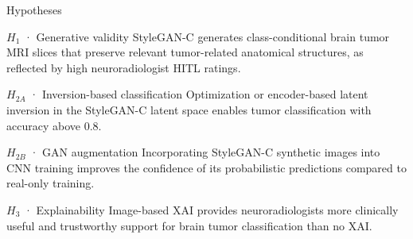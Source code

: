 \documentclass[aspectratio=169]{beamer}
\begin{document}
\begin{frame}{Hypotheses}
  \scriptsize
  {%
  \begin{exampleblock}{$H_1$ · Generative validity}
    StyleGAN-C generates class-conditional brain tumor MRI slices that preserve
    relevant tumor-related anatomical structures, as reflected by high
    neuroradiologist HITL ratings.
  \end{exampleblock}}
  \vspace{-0.4em}
  {%
  \begin{exampleblock}{$H_{2A}$ · Inversion-based classification}
    Optimization or encoder-based latent inversion in the StyleGAN-C latent space
    enables tumor classification with accuracy above 0.8.
  \end{exampleblock}}
  \vspace{-0.4em}
  {%
  \begin{exampleblock}{$H_{2B}$ · GAN augmentation}
    Incorporating StyleGAN-C synthetic images into CNN training improves the
    confidence of its probabilistic predictions compared to real-only training.
  \end{exampleblock}}
  \vspace{-0.4em}
  {%
  \begin{exampleblock}{$H_3$ · Explainability}
    Image-based XAI provides neuroradiologists more clinically useful and
    trustworthy support for brain tumor classification than no XAI.
  \end{exampleblock}}
\end{frame}

\end{document}
